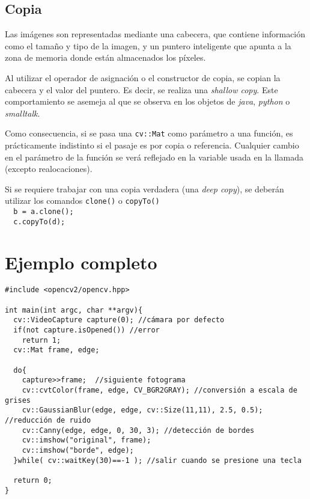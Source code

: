 \documentclass[oneside,a4paper]{book}
\newcommand{\tc}[1]{\texttt{#1}}
\begin{document}
		\subsection{Copia}
			Las imágenes son representadas mediante una cabecera, que contiene información como el tamaño y tipo de la imagen, y un puntero inteligente que apunta a la zona de memoria donde están almacenados los píxeles.

			Al utilizar el operador de asignación o el constructor de copia, se copian la cabecera y el valor del puntero. Es decir, se realiza una \emph{shallow copy}. Este comportamiento se asemeja al que se observa en los objetos de \emph{java}, \emph{python} o \emph{smalltalk}.

			Como consecuencia, si se pasa una \tc{cv::Mat} como parámetro a una función, es prácticamente indistinto si el pasaje es por copia o referencia.
			Cualquier cambio en el parámetro de la función se verá reflejado en la variable usada en la llamada (excepto realocaciones).

			Si se requiere trabajar con una copia verdadera (una \emph{deep copy}), se deberán utilizar los comandos \tc{clone()} o \tc{copyTo()}\\
			\verb|  b = a.clone();|\\
			\verb|  c.copyTo(d);|

	\section{Ejemplo completo}
\begin{lstlisting}
#include <opencv2/opencv.hpp>

int main(int argc, char **argv){
  cv::VideoCapture capture(0); //cámara por defecto
  if(not capture.isOpened()) //error
    return 1;
  cv::Mat frame, edge;

  do{
    capture>>frame;  //siguiente fotograma
    cv::cvtColor(frame, edge, CV_BGR2GRAY); //conversión a escala de grises
    cv::GaussianBlur(edge, edge, cv::Size(11,11), 2.5, 0.5); //reducción de ruido
    cv::Canny(edge, edge, 0, 30, 3); //detección de bordes
    cv::imshow("original", frame);
    cv::imshow("borde", edge);
  }while( cv::waitKey(30)==-1 ); //salir cuando se presione una tecla

  return 0;
}
\end{lstlisting}
\end{document}
